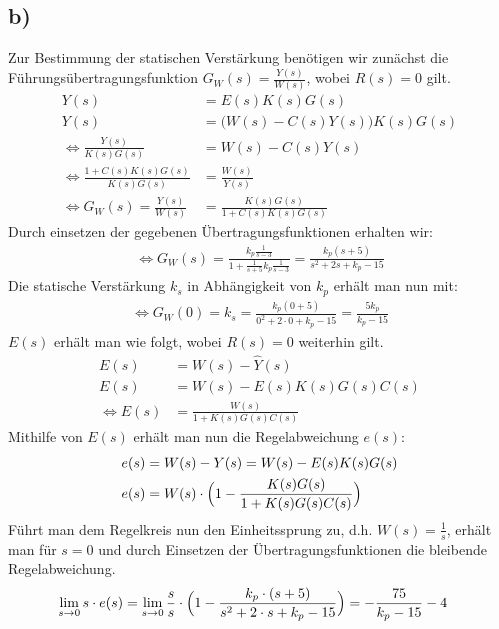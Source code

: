 \documentclass[11pt]{scrartcl} %
\begin{document}
\subsection*{b)}
Zur Bestimmung der statischen Verstärkung benötigen wir zunächst die Führungsübertragungsfunktion $G_W(s)=\frac{Y(s)}{W(s)}$, wobei $R(s)=0$ gilt.
\begin{align*}
	Y(s)&=E(s)K(s)G(s)\\
	Y(s)&=\bigl(W(s)-C(s)Y(s)\bigr)K(s)G(s)\\
	\Leftrightarrow\frac{Y(s)}{K(s)G(s)}&=W(s)-C(s)Y(s)\\
	\Leftrightarrow\frac{1+C(s)K(s)G(s)}{K(s)G(s)}&=\frac{W(s)}{Y(s)}\\
	\Leftrightarrow G_W(s)=\frac{Y(s)}{W(s)}&=\frac{K(s)G(s)}{1+C(s)K(s)G(s)}
\end{align*}
Durch einsetzen der gegebenen Übertragungsfunktionen erhalten wir:
\begin{align*}
	\Leftrightarrow G_W(s)=\frac{k_p\frac{1}{s-3}}{1+\frac{1}{s+5}k_p\frac{1}{s-3}}=\frac{k_p(s+5)}{s^2+2s+k_p-15}
\end{align*}
Die statische Verstärkung $k_s$ in Abhängigkeit von $k_p$ erhält man nun mit:
\begin{align*}
	\Leftrightarrow G_W(0)=k_s=\frac{k_p(0+5)}{0^2+2\cdot0+k_p-15}=\frac{5k_p}{k_p-15}
\end{align*}
$E(s)$ erhält man wie folgt, wobei $R(s)=0$ weiterhin gilt.
\begin{align*}
	E(s)&=W(s)-\hat{Y}(s)\\
	E(s)&=W(s)-E(s)K(s)G(s)C(s)\\
	\Leftrightarrow E(s)&=\frac{W(s)}{1+K(s)G(s)C(s)}
\end{align*}
Mithilfe von $E(s)$ erhält man nun die Regelabweichung $e(s)$:
\begin{align*}
	e(s)&=W(s)-Y(s)=W(s)-E(s)K(s)G(s)\\
	e(s)&=W(s)\cdot\Bigl(1-\frac{K(s)G(s)}{1+K(s)G(s)C(s)}\Bigr)\\
\end{align*}
Führt man dem Regelkreis nun den Einheitssprung zu, d.h. $W(s)=\frac{1}{s}$, erhält man für $s=0$ und durch Einsetzen der Übertragungsfunktionen die bleibende Regelabweichung.
\begin{align*}
	\lim \limits_{s \to 0}s\cdot e(s)&=\lim \limits_{s \to 0}\frac{s}{s}\cdot\Bigl(1-\frac{k_p\cdot(s+5)}{s^2+2\cdot s+k_p-15}\Bigr)=-\frac{75}{k_p-15}-4
\end{align*}
\end{document}
